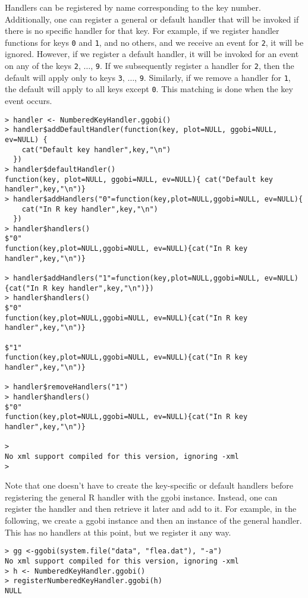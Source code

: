 \documentclass{article}
\def\Key#1{\texttt{#1}}
\begin{document}
Handlers can be registered by name corresponding to the key number.
Additionally, one can register a general or default handler that will
be invoked if there is no specific handler for that key.  For example,
if we register handler functions for keys \Key{0} and \Key{1}, and no
others, and we receive an event for \Key{2}, it will be ignored.
However, if we register a default handler, it will be invoked for an
event on any of the keys \Key{2}, $\ldots$, \Key{9}.  If we
subsequently register a handler for \Key{2}, then the default will
apply only to keys \Key{3}, $\ldots$, \Key{9}.  Similarly, if we
remove a handler for \Key{1}, the default will apply to all keys
except \Key{0}. This matching is done when the key event occurs.


\begin{verbatim}
> handler <- NumberedKeyHandler.ggobi()
> handler$addDefaultHandler(function(key, plot=NULL, ggobi=NULL, ev=NULL) {
    cat("Default key handler",key,"\n")
  })
> handler$defaultHandler()
function(key, plot=NULL, ggobi=NULL, ev=NULL){ cat("Default key handler",key,"\n")}
> handler$addHandlers("0"=function(key,plot=NULL,ggobi=NULL, ev=NULL){
    cat("In R key handler",key,"\n")
  })
> handler$handlers()
$"0"
function(key,plot=NULL,ggobi=NULL, ev=NULL){cat("In R key handler",key,"\n")}

> handler$addHandlers("1"=function(key,plot=NULL,ggobi=NULL, ev=NULL){cat("In R key handler",key,"\n")})
> handler$handlers()
$"0"
function(key,plot=NULL,ggobi=NULL, ev=NULL){cat("In R key handler",key,"\n")}

$"1"
function(key,plot=NULL,ggobi=NULL, ev=NULL){cat("In R key handler",key,"\n")}

> handler$removeHandlers("1")
> handler$handlers()
$"0"
function(key,plot=NULL,ggobi=NULL, ev=NULL){cat("In R key handler",key,"\n")}

> 
No xml support compiled for this version, ignoring -xml
> 
\end{verbatim}


Note that one doesn't have to create the key-specific or default
handlers before registering the general R handler with the ggobi
instance. Instead, one can register the handler and then retrieve it
later and add to it. 
For example, in the following, we 
create a ggobi instance and then
an instance of the general handler.
This has no handlers at this point, but 
we register it any way.
\begin{verbatim}
> gg <-ggobi(system.file("data", "flea.dat"), "-a")
No xml support compiled for this version, ignoring -xml
> h <- NumberedKeyHandler.ggobi()
> registerNumberedKeyHandler.ggobi(h)
NULL
\end{verbatim}
\end{document}
